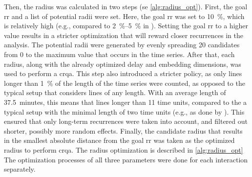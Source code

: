 Then, the radius was calculated in two steps (se \cref{alg:radius_opt}).
First, the goal \ac{rr} and a list of potential radii were set.
Here, the goal \ac{rr} was set to \SI{10}{\percent}, which is relatively high (e.g., compared to \SIrange{2}{5}{\percent} in \citet{Coco2014crqa-r}).
Setting the goal \ac{rr} to a higher value results in a stricter optimization that will reward closer recurrences in the analysis.
The potential radii were generated by evenly spreading 20 candidates from 0 to the maximum value that occurs in the time series.
After that, each radius, along with the already optimized delay and embedding dimensions, was used to perform a \ac{crqa}.
This step also introduced a stricter policy, as only lines longer than \SI{1}{\percent} of the length of the time series were counted, as opposed to the typical setup that considers lines of any length.
With an average length of \SI{37.5}{minutes}, this means that lines longer than 11 time units, compared to the a typical setup with the minimal length of two time units (e.g., as done by \citet{Borrie2019syncing}).
This ensured that only long-term recurrences were taken into account, and filtered out shorter, possibly more random effects.
Finally, the candidate radius that results in the smallest absolute distance from the goal \ac{rr} was taken as the optimized radius to perform \ac{crqa}.
The radius optimization is described in \cref{alg:radius_opt}
The optimization processes of all three parameters were done for each interaction separately.

